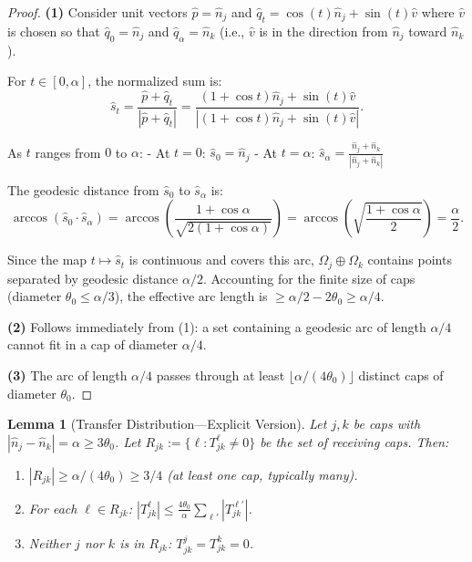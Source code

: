 \documentclass[11pt]{article}
\newtheorem{lemma}[theorem]{Lemma}
\theoremstyle{definition}
\begin{document}
\begin{proof}
\textbf{(1)} Consider unit vectors $\hat{p} = \hat{n}_j$ and $\hat{q}_t = \cos(t)\hat{n}_j + \sin(t)\hat{v}$ where $\hat{v}$ is chosen so that $\hat{q}_0 = \hat{n}_j$ and $\hat{q}_\alpha = \hat{n}_k$ (i.e., $\hat{v}$ is in the direction from $\hat{n}_j$ toward $\hat{n}_k$).

For $t \in [0, \alpha]$, the normalized sum is:
\begin{equation}
\hat{s}_t = \frac{\hat{p} + \hat{q}_t}{|\hat{p} + \hat{q}_t|} = \frac{(1 + \cos t)\hat{n}_j + \sin(t)\hat{v}}{|(1 + \cos t)\hat{n}_j + \sin(t)\hat{v}|}.
\end{equation}

As $t$ ranges from $0$ to $\alpha$:
- At $t = 0$: $\hat{s}_0 = \hat{n}_j$
- At $t = \alpha$: $\hat{s}_\alpha = \frac{\hat{n}_j + \hat{n}_k}{|\hat{n}_j + \hat{n}_k|}$

The geodesic distance from $\hat{s}_0$ to $\hat{s}_\alpha$ is:
\begin{equation}
\arccos(\hat{s}_0 \cdot \hat{s}_\alpha) = \arccos\left(\frac{1 + \cos\alpha}{\sqrt{2(1 + \cos\alpha)}}\right) = \arccos\left(\sqrt{\frac{1 + \cos\alpha}{2}}\right) = \frac{\alpha}{2}.
\end{equation}

Since the map $t \mapsto \hat{s}_t$ is continuous and covers this arc, $\Omega_j \oplus \Omega_k$ contains points separated by geodesic distance $\alpha/2$. Accounting for the finite size of caps (diameter $\theta_0 \leq \alpha/3$), the effective arc length is $\geq \alpha/2 - 2\theta_0 \geq \alpha/4$.

\textbf{(2)} Follows immediately from (1): a set containing a geodesic arc of length $\alpha/4$ cannot fit in a cap of diameter $\alpha/4$.

\textbf{(3)} The arc of length $\alpha/4$ passes through at least $\lfloor \alpha/(4\theta_0) \rfloor$ distinct caps of diameter $\theta_0$.
\end{proof}

\begin{lemma}[Transfer Distribution---Explicit Version]\label{lem:transfer-dist}
Let $j, k$ be caps with $|\hat{n}_j - \hat{n}_k| = \alpha \geq 3\theta_0$. Let $R_{jk} := \{\ell : T_{jk}^\ell \neq 0\}$ be the set of receiving caps. Then:
\begin{enumerate}
\item $|R_{jk}| \geq \alpha/(4\theta_0) \geq 3/4$ (at least one cap, typically many).
\item For each $\ell \in R_{jk}$: $|T_{jk}^\ell| \leq \frac{4\theta_0}{\alpha} \sum_{\ell'} |T_{jk}^{\ell'}|$.
\item Neither $j$ nor $k$ is in $R_{jk}$: $T_{jk}^j = T_{jk}^k = 0$.
\end{enumerate}
\end{lemma}
\end{document}
